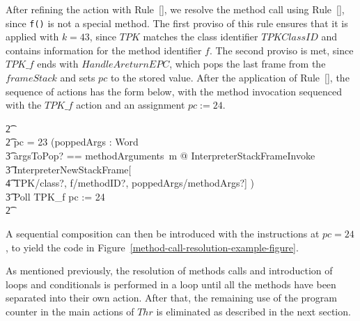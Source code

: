 After refining the action with
Rule~[], we resolve the method call
using Rule~[], since \texttt{f()}
is not a special method.
The first proviso of this rule ensures that it is applied with
$k = 43$, since $TPK$ matches the class identifier $TPKClassID$ and
contains information for the method identifier $f$.
The second proviso is met, since $TPK\_f$ ends with
$HandleAreturnEPC$, which pops the last frame from the $frameStack$
and sets $pc$ to the stored value.
After the application of Rule~[],
the sequence of actions has the form below, with the method invocation
sequenced with the $TPK\_f$ action and an assignment $pc := 24$.
\begin{circusaction}
  \t2 {} \cdots {} \\
  \t2 {} \circelse pc = 23 \circthen (\circvar poppedArgs : \seq Word \circspot \\
  \t3 \lschexpract \exists argsToPop? == methodArguments~m @ InterpreterStackFrameInvoke \rschexpract \circseq \\
  \t3 \lschexpract InterpreterNewStackFrame[ \\
  \t4 TPK/class?, f/methodID?, poppedArgs/methodArgs?] \rschexpract) \circseq \\
  \t3 Poll \circseq TPK\_f \circseq pc := 24 \\
  \t2 {} \cdots {}
\end{circusaction}
A sequential composition can then be introduced with the instructions
at $pc = 24$, to yield the code in
Figure~\ref{method-call-resolution-example-figure}.

As mentioned previously, the resolution of methods calls and
introduction of loops and conditionals is performed in a loop until all
the methods have been separated into their own action.
After that, the remaining use of the program counter in the main
actions of $Thr$ is eliminated as described in the next section.